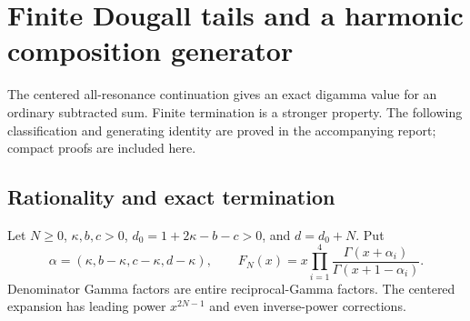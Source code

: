 \section{Finite Dougall tails and a harmonic composition generator}
\label{dterm:section}
The centered all-resonance continuation gives an exact digamma value for
an ordinary subtracted sum. Finite termination is a stronger property.
The following classification and generating identity are proved in the
accompanying report; compact proofs are included here.

\subsection{Rationality and exact termination}
Let $N\ge0$, $\kappa,b,c>0$, $d_0=1+2\kappa-b-c>0$, and
$d=d_0+N$. Put
\[
 \alpha=(\kappa,b-\kappa,c-\kappa,d-\kappa),\qquad
 F_N(x)=x\prod_{i=1}^4\frac{\Gamma(x+\alpha_i)}{\Gamma(x+1-\alpha_i)}.
\]
Denominator Gamma factors are entire reciprocal-Gamma factors.
The centered expansion has leading power $x^{2N-1}$ and even
inverse-power corrections.

